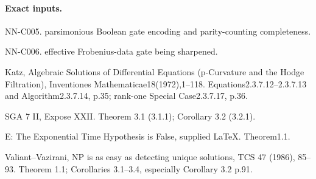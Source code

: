 \paragraph{Exact inputs.}
NN-C005. parsimonious Boolean gate encoding and parity-counting completeness.

NN-C006. effective Frobenius-data gate being sharpened.

Katz, Algebraic Solutions of Differential Equations (p-Curvature and the Hodge Filtration), Inventiones Mathematicae18(1972),1--118. Equations2.3.7.12--2.3.7.13 and Algorithm2.3.7.14, p.35; rank-one Special Case2.3.7.17, p.36.

SGA 7 II, Expose XXII. Theorem 3.1 (3.1.1); Corollary 3.2 (3.2.1).

E: The Exponential Time Hypothesis is False, supplied LaTeX. Theorem1.1.

Valiant--Vazirani, NP is as easy as detecting unique solutions, TCS 47 (1986), 85--93. Theorem 1.1; Corollaries 3.1--3.4, especially Corollary 3.2 p.91.

